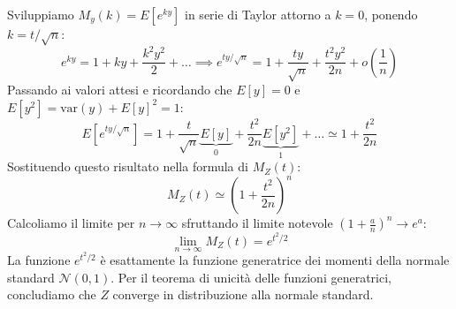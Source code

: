 \documentclass[openany,a4paper,12pt]{book}
\theoremstyle{remark}
\begin{document}
Sviluppiamo $M_y(k) = E[e^{ky}]$ in serie di Taylor attorno a $k=0$, ponendo $k = t/\sqrt{n}$:
\begin{equation}
e^{ky} = 1 + ky + \frac{k^2 y^2}{2} + \dots \implies e^{ty/\sqrt{n}} = 1 + \frac{ty}{\sqrt{n}} + \frac{t^2 y^2}{2n} + o\left(\frac{1}{n}\right)
\end{equation}
Passando ai valori attesi e ricordando che $E[y]=0$ e $E[y^2] = \text{var}(y) + E[y]^2 = 1$:
\begin{equation}
E\left[ e^{ty/\sqrt{n}} \right] = 1 + \frac{t}{\sqrt{n}}\underbrace{E[y]}_{0} + \frac{t^2}{2n}\underbrace{E[y^2]}_{1} + \dots \simeq 1 + \frac{t^2}{2n}
\end{equation}
Sostituendo questo risultato nella formula di $M_Z(t)$:
\begin{equation}
M_Z(t) \simeq \left( 1 + \frac{t^2}{2n} \right)^n
\end{equation}
Calcoliamo il limite per $n \to \infty$ sfruttando il limite notevole $(1 + \frac{a}{n})^n \to e^a$:
\begin{equation}
\lim_{n \to \infty} M_Z(t) = e^{t^2/2}
\end{equation}
La funzione $e^{t^2/2}$ è esattamente la funzione generatrice dei momenti della normale standard $\mathcal{N}(0,1)$. Per il teorema di unicità delle funzioni generatrici, concludiamo che $Z$ converge in distribuzione alla normale standard.
\end{document}
